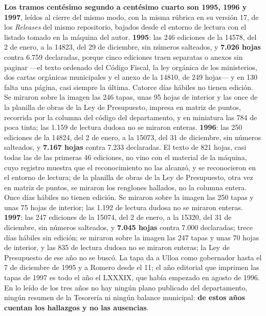 \textbf{Los tramos centésimo segundo a centésimo cuarto son 1995, 1996 y 1997}, leídos al cierre del mismo modo, con la misma rúbrica en su versión 17, de los \textit{Releases} del mismo repositorio, bajados desde el entorno de lectura con el listado tomado en la máquina del autor. \textbf{1995}: las 246 ediciones de la 14578, del 2 de enero, a la 14823, del 29 de diciembre, sin números salteados, y \textbf{7.026 hojas} contra 6.759 declaradas, porque cinco ediciones traen separatas o anexos sin paginar ---el texto ordenado del Código Fiscal, la ley orgánica de los ministerios, dos cartas orgánicas municipales y el anexo de la 14810, de 249 hojas--- y en 130 falta una página, casi siempre la última. Catorce días hábiles no tienen edición. Se miraron sobre la imagen las 246 tapas, unas 95 hojas de interior y las once de la planilla de obras de la Ley de Presupuesto, impresa en matriz de puntos, recorrida por la columna del código del departamento, y en miniatura las 784 de poca tinta; las 1.159 de lectura dudosa no se miraron enteras. \textbf{1996}: las 250 ediciones de la 14824, del 2 de enero, a la 15073, del 31 de diciembre, sin números salteados, y \textbf{7.167 hojas} contra 7.233 declaradas. El texto de 821 hojas, casi todas las de las primeras 46 ediciones, no vino con el material de la máquina, cuyo registro muestra que el reconocimiento no las alcanzó, y se reconocieron en el entorno de lectura; de la planilla de obras de la Ley de Presupuesto, otra vez en matriz de puntos, se miraron los renglones hallados, no la columna entera. Once días hábiles no tienen edición. Se miraron sobre la imagen las 250 tapas y unas 75 hojas de interior; las 1.192 de lectura dudosa no se miraron enteras. \textbf{1997}: las 247 ediciones de la 15074, del 2 de enero, a la 15320, del 31 de diciembre, sin números salteados, y \textbf{7.045 hojas} contra 7.000 declaradas; trece días hábiles sin edición; se miraron sobre la imagen las 247 tapas y unas 70 hojas de interior, y las 835 de lectura dudosa no se miraron enteras; la Ley de Presupuesto de ese año no se buscó. La tapa da a Ulloa como gobernador hasta el 7 de diciembre de 1995 y a Romero desde el 11; el año editorial que imprimen las tapas de 1997 es todo el año el LXXXIX, que había empezado en agosto de 1996. En lo leído de los tres años no hay ningún plano publicado del departamento, ningún resumen de la Tesorería ni ningún balance municipal: \textbf{de estos años cuentan los hallazgos y no las ausencias}.

